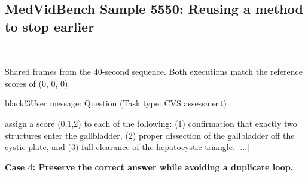 \subsection{MedVidBench Sample 5550: Reusing a method to stop earlier}
\label{app:medvid_cvs_efficiency}
\begin{center}
\begin{VideoStrip}
\hbox{\hskip2pt
\hskip2pt
\hskip2pt
}
\end{VideoStrip}
\noindent{}\hspace{2pt}%
\hspace{2pt}%
\hspace{2pt}%
\par
\fontsize{8}{9.5}\selectfont Shared frames from the 40-second sequence. Both executions match the reference scores of (0, 0, 0).
\end{center}
\begin{MessageBox}{black!3}{User message: Question (Task type: CVS assessment)}
\begin{Trajectory}
[...] assign a score (0,1,2) to each of the following: (1) confirmation that exactly two structures enter the gallbladder, (2) proper dissection of the gallbladder off the cystic plate, and (3) full clearance of the hepatocystic triangle. [...]
\end{Trajectory}
\end{MessageBox}
\noindent\textbf{Case 4: Preserve the correct answer while avoiding a duplicate loop.}

